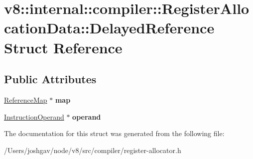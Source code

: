 \hypertarget{structv8_1_1internal_1_1compiler_1_1_register_allocation_data_1_1_delayed_reference}{}\section{v8\+:\+:internal\+:\+:compiler\+:\+:Register\+Allocation\+Data\+:\+:Delayed\+Reference Struct Reference}
\label{structv8_1_1internal_1_1compiler_1_1_register_allocation_data_1_1_delayed_reference}
\subsection*{Public Attributes}
\begin{DoxyCompactItemize}
\item 
\hyperlink{classv8_1_1internal_1_1compiler_1_1_reference_map}{Reference\+Map} $\ast$ {\bfseries map}\hypertarget{structv8_1_1internal_1_1compiler_1_1_register_allocation_data_1_1_delayed_reference_a4817fbb935247a7ff68c97e11f5cf69d}{}\label{structv8_1_1internal_1_1compiler_1_1_register_allocation_data_1_1_delayed_reference_a4817fbb935247a7ff68c97e11f5cf69d}

\item 
\hyperlink{classv8_1_1internal_1_1compiler_1_1_instruction_operand}{Instruction\+Operand} $\ast$ {\bfseries operand}\hypertarget{structv8_1_1internal_1_1compiler_1_1_register_allocation_data_1_1_delayed_reference_a74f07c5a15df2b44eb91e07da2a8e352}{}\label{structv8_1_1internal_1_1compiler_1_1_register_allocation_data_1_1_delayed_reference_a74f07c5a15df2b44eb91e07da2a8e352}

\end{DoxyCompactItemize}


The documentation for this struct was generated from the following file\+:\begin{DoxyCompactItemize}
\item 
/\+Users/joshgav/node/v8/src/compiler/register-\/allocator.\+h\end{DoxyCompactItemize}
